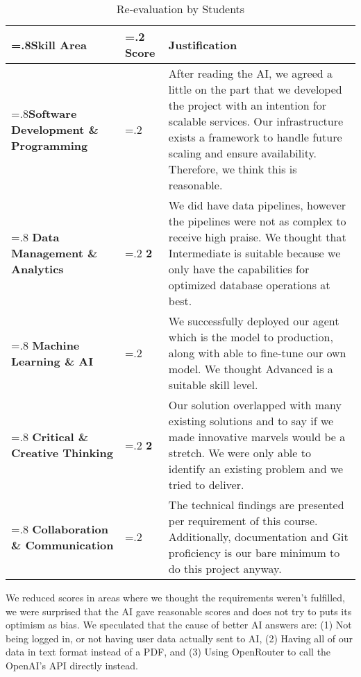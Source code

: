 \begin{table}[ht!]
    \centering
    \small\begin{tabularx}{\textwidth}{| >{\hsize=.8\hsize}X | >{\hsize=.2\hsize}X | >{\hsize=2.0\hsize}X |}
        \hline
        \textbf{Skill Area} & \textbf{Score} & \textbf{Justification} \\\hline
        \textbf{Software Development \& Programming} & 3 & After reading the AI, we agreed a little on the part that we developed the project with an intention for scalable services. Our infrastructure exists a framework to handle future scaling and ensure availability. Therefore, we think this is reasonable. \\ \hline
        \textbf{Data Management \& Analytics} & \textbf{2} & We did have data pipelines, however the pipelines were not as complex to receive high praise. We thought that Intermediate is suitable because we only have the capabilities for optimized database operations at best. \\ \hline
        \textbf{Machine Learning \& AI} & 3 & We successfully deployed our agent which is the model to production, along with able to fine-tune our own model. We thought Advanced is a suitable skill level. \\ \hline
        \textbf{Critical \& Creative Thinking} & \textbf{2} & Our solution overlapped with many existing solutions and to say if we made innovative marvels would be a stretch. We were only able to identify an existing problem and we tried to deliver. \\ \hline
        \textbf{Collaboration \& Communication} & 3 & The technical findings are presented per requirement of this course. Additionally, documentation and Git proficiency is our bare minimum to do this project anyway. \\ \hline
    \end{tabularx}
    \caption{Re-evaluation by Students}
    \label{table:student-reevaluation}
\end{table}

We reduced scores in areas where we thought the requirements weren't fulfilled, we were surprised that the AI gave reasonable scores and does not try to puts its optimism as bias.
We speculated that the cause of better AI answers are: (1) Not being logged in, or not having user data actually sent to AI, (2) Having all of our data in text format instead of a PDF,
and (3) Using OpenRouter to call the OpenAI's API directly instead.


